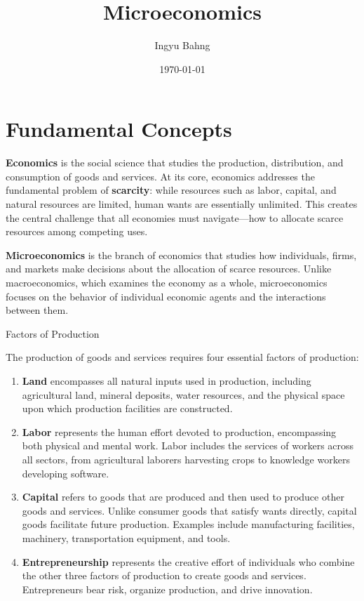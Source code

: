 \documentclass[10pt]{article}
\title{Microeconomics}
\date{\today}
\author{Ingyu Bahng}
\begin{document}


\section{Fundamental Concepts}

  \textbf{Economics} is the social science that studies the production, distribution, and consumption of goods and services. At its core, economics addresses the fundamental problem of \textbf{scarcity}: while resources such as labor, capital, and natural resources are limited, human wants are essentially unlimited. This creates the central challenge that all economies must navigate---how to allocate scarce resources among competing uses. 

  \textbf{Microeconomics} is the branch of economics that studies how individuals, firms, and markets make decisions about the allocation of scarce resources. Unlike macroeconomics, which examines the economy as a whole, microeconomics focuses on the behavior of individual economic agents and the interactions between them.

  \begin{core}{Factors of Production} 

    The production of goods and services requires four essential factors of production: 

    \begin{enumerate}

      \item \textbf{Land} encompasses all natural inputs used in production, including agricultural land, mineral deposits, water resources, and the physical space upon which production facilities are constructed.

      \item \textbf{Labor} represents the human effort devoted to production, encompassing both physical and mental work. Labor includes the services of workers across all sectors, from agricultural laborers harvesting crops to knowledge workers developing software.

      \item \textbf{Capital} refers to goods that are produced and then used to produce other goods and services. Unlike consumer goods that satisfy wants directly, capital goods facilitate future production. Examples include manufacturing facilities, machinery, transportation equipment, and tools.

      \item \textbf{Entrepreneurship} represents the creative effort of individuals who combine the other three factors of production to create goods and services. Entrepreneurs bear risk, organize production, and drive innovation.

    \end{enumerate}

  \end{core}
\end{document}
